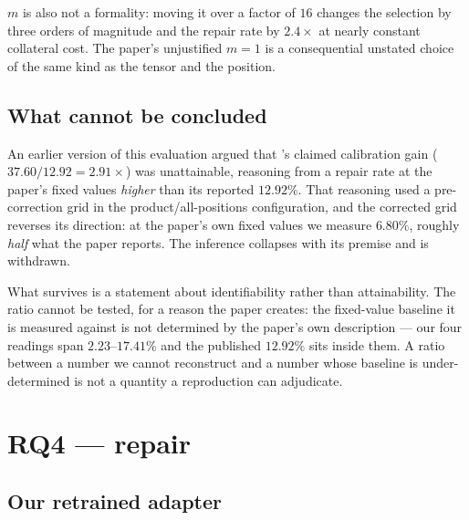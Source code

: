 $m$ is also not a formality: moving it over a factor of $16$ changes the
selection by three orders of magnitude and the repair rate by $2.4\times$ at
nearly constant collateral cost. The paper's unjustified $m = 1$ is a
consequential unstated choice of the same kind as the tensor and the position.

\subsection{What cannot be concluded}

An earlier version of this evaluation argued that \gp{}'s claimed calibration
gain ($37.60/12.92 = 2.91\times$) was unattainable, reasoning from a repair rate
at the paper's fixed values \emph{higher} than its reported $12.92\%$. That
reasoning used a pre-correction grid in the product/all-positions configuration,
and the corrected grid reverses its direction: at the paper's own fixed values we
measure $6.80\%$, roughly \emph{half} what the paper reports. The inference
collapses with its premise and is withdrawn.

What survives is a statement about identifiability rather than attainability. The
ratio cannot be tested, for a reason the paper creates: the fixed-value baseline
it is measured against is not determined by the paper's own description --- our
four readings span $2.23$--$17.41\%$ and the published $12.92\%$ sits inside
them. A ratio between a number we cannot reconstruct and a number whose baseline
is under-determined is not a quantity a reproduction can adjudicate.

\section{RQ4 --- \gc{} repair}
\label{sec:rq4}

\subsection{Our retrained adapter}


